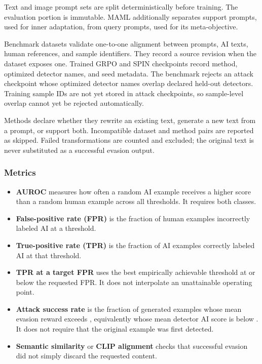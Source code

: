 Text and image prompt sets are split deterministically before training.
The evaluation portion is immutable. MAML additionally separates support
prompts, used for inner adaptation, from query prompts, used for its
meta-objective.

Benchmark datasets validate one-to-one alignment between prompts, AI
texts, human references, and sample identifiers. They record a source
revision when the dataset exposes one. Trained GRPO and SPIN checkpoints
record method, optimized detector names, and seed metadata. The
benchmark rejects an attack checkpoint whose optimized detector names
overlap declared held-out detectors. Training sample IDs are not yet
stored in attack checkpoints, so sample-level overlap cannot yet be
rejected automatically.

Methods declare whether they rewrite an existing text, generate a new
text from a prompt, or support both. Incompatible dataset and method
pairs are reported as skipped. Failed transformations are counted and
excluded; the original text is never substituted as a successful evasion
output.

\subsubsection{Metrics}\label{record-docs-research-guide-md-metrics}

\begin{itemize}
\tightlist
\item
  \textbf{AUROC} measures how often a random AI example receives a
  higher score than a random human example across all thresholds. It
  requires both classes.
\item
  \textbf{False-positive rate (FPR)} is the fraction of human examples
  incorrectly labeled AI at a threshold.
\item
  \textbf{True-positive rate (TPR)} is the fraction of AI examples
  correctly labeled AI at that threshold.
\item
  \textbf{TPR at a target FPR} uses the best empirically achievable
  threshold at or below the requested FPR. It does not interpolate an
  unattainable operating point.
\item
  \textbf{Attack success rate} is the fraction of generated examples
  whose mean evasion reward exceeds \texttt{},
  equivalently whose mean detector AI score is below
  \texttt{}. It does not require that the original example
  was first detected.
\item
  \textbf{Semantic similarity} or \textbf{CLIP alignment} checks that
  successful evasion did not simply discard the requested content.
\end{itemize}

